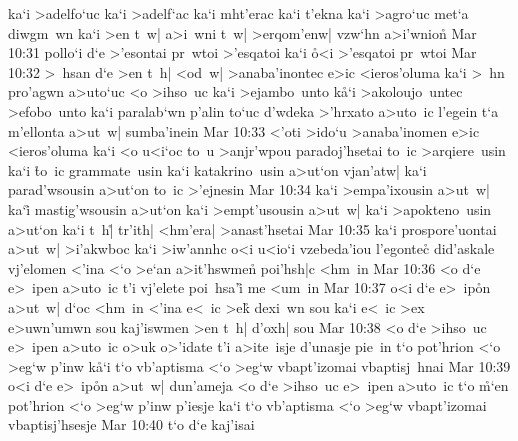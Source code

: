 ka`i
>adelfo`uc
ka`i
>adelf`ac
ka`i
mht'erac
ka`i
t'ekna
ka`i
>agro`uc
met`a
diwgm~wn
ka`i
>en
t~w|
a>i~wni
t~w|
>erqom'enw|
vzw`hn
a>i'wnio\r{n}\bibvsend
{}
\vs Mar 10:31
pollo`i
d`e
>'esontai
pr~wtoi
>'esqatoi
ka`i
\r{o}<i
>'esqatoi
pr~wtoi\bibvsend
\vs Mar 10:32
>~hsan
d`e
>en
t~h|
<od~w|
>anaba'inontec
e>ic
<ieros'oluma
ka`i
>~hn
pro'agwn
a>uto`uc
<o
>ihso~uc
ka`i
>ejambo~unto
k\r{a}`i
>akoloujo~untec
>efobo~unto
ka`i
paralab`wn
p'alin
to`uc
d'wdeka
>'hrxato
a>uto~ic
l'egein
t`a
m'ellonta
a>ut~w|
sumba'inein\bibvsend
\vs Mar 10:33
<'oti
>ido`u
>anaba'inomen
e>ic
<ieros'oluma
ka`i
<o
u<i`oc
to~u
>anjr'wpou
paradoj'hsetai
to~ic
>arqiere~usin
ka`i
\r{t}o~ic
grammate~usin
ka`i
katakrino~usin
a>ut`on
vjan'atw|
ka`i
parad'wsousin
a>ut`on
to~ic
>'ejnesin\bibvsend
\vs Mar 10:34
ka`i
>empa'ixousin
a>ut~w|
ka`i\r{}
mastig'wsousin
a>ut`on
ka`i
>empt'usousin
a>ut~w|
ka`i
>apokteno~usin
a>ut`on
ka`i
t~h|\r{}
tr'ith|
<hm'era|
>anast'hsetai\bibvsend
\vs Mar 10:35
ka`i
prospore'uontai
a>ut~w|
>i'akwboc
ka`i
>iw'annhc
o<i
u<io`i
vzebeda'iou
l'egonte\r{c}
did'askale
vj'elomen
<'ina
<`o
>e`an
a>it'hswme\r{n}
poi'hsh|c
<hm~in\bibvsend
\vs Mar 10:36
<o
d`e
e>~ipen
a>uto~ic
t'i
vj'elete
poi~hsa'i\r{}
me
<um~in\bibvsend
\vs Mar 10:37
o<i
d`e
e>~ip\r{o}n
a>ut~w|
d`oc
<hm~in
<'ina
e<~ic
>ek\r{}
dexi~wn
sou
ka`i
e<~ic
>ex
e>uwn'umwn
sou
kaj'iswmen
>en
t~h|
d'oxh|
sou\bibvsend
\vs Mar 10:38
<o
d`e
>ihso~uc
e>~ipen
a>uto~ic
o>uk
o>'idate
t'i
a>ite~isje
d'unasje
pie~in
t`o
pot'hrion
<`o
>eg`w
p'inw
k\r{a}`i
t`o
vb'aptisma
<`o
>eg`w
vbapt'izomai
vbaptisj~hnai\bibvsend
\vs Mar 10:39
o<i
d`e
e>~ip\r{o}n
a>ut~w|
dun'ameja
<o
d`e
>ihso~uc
e>~ipen
a>uto~ic
t`o
\r{m}`en
pot'hrion
<`o
>eg`w
p'inw
p'iesje
ka`i
t`o
vb'aptisma
<`o
>eg`w
vbapt'izomai
vbaptisj'hsesje\bibvsend
\vs Mar 10:40
t`o
d`e
kaj'isai
